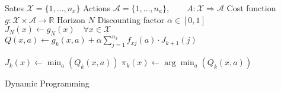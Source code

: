 \documentclass{article}
\begin{document}
\begin{preview}
    \begin{algorithm}[H]
        \begin{algorithmic}
        \Require
        \Statex Sates $\mathcal{X} = \{1, \dots, n_x\}$
        \Statex Actions $\mathcal{A} = \{1, \dots, n_a\},\qquad A: \mathcal{X} \Rightarrow \mathcal{A}$
        \Statex Cost function $g: \mathcal{X} \times \mathcal{A} \rightarrow \mathbb{R}$
        \Statex Horizon $N$
        \Statex Discounting factor $\alpha \in [0, 1]$
            \State $J_N(x) \gets g_N(x) \quad \forall x \in \mathcal{X}$
                        \State $Q(x, a) \gets g_k(x, a) + \alpha \sum_{j=1}^{n_x} f_{xj}(a) \cdot J_{k+1}(j)$
                    \EndFor

                    \State $J_k (x) \gets \min_a (Q_k(x,a))$
                    \State $\pi_k(x) \gets \arg \min_a (Q_k(x, a))$
                \EndFor
            \EndFor
        \EndProcedure
        \end{algorithmic}
    \caption{Dynamic Programming}
    \label{alg:dynamic-programming}
    \end{algorithm}
\end{preview}
\end{document}
